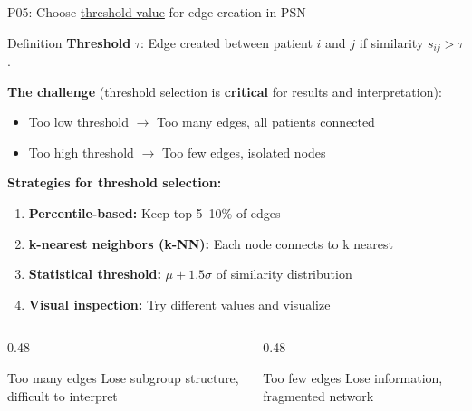 \documentclass[aspectratio=169, 10pt]{beamer}
\begin{document}
\begin{frame}{P05: Choose \href{https://en.wikipedia.org/wiki/Threshold_model}{threshold value} for edge creation in PSN}
    \begin{block}{\footnotesize Definition}
        \footnotesize \textbf{Threshold} $\tau$: Edge created between patient $i$ and $j$ if similarity $s_{ij} > \tau$.
    \end{block}
    
    \vspace{1mm}
    \textbf{The challenge} (threshold selection is \textbf{critical} for results and interpretation):
    \begin{itemize}\setlength{\itemsep}{0pt}
        \item Too low threshold $\rightarrow$ Too many edges, all patients connected
        \item Too high threshold $\rightarrow$ Too few edges, isolated nodes
    \end{itemize}
    
    \vspace{1mm}
    \textbf{Strategies for threshold selection:}
    \begin{enumerate}\setlength{\itemsep}{0pt}
        \item \textbf{Percentile-based:} Keep top 5--10\% of edges
        \item \textbf{k-nearest neighbors (k-NN):} Each node connects to k nearest
        \item \textbf{Statistical threshold:} $\mu + 1.5\sigma$ of similarity distribution
        \item \textbf{Visual inspection:} Try different values and visualize
    \end{enumerate}
    
    \vspace{1mm}
    \begin{columns}[T]
        \begin{column}{0.48\textwidth}
            \begin{alertblock}{\scriptsize Too many edges}
                \scriptsize Lose subgroup structure, difficult to interpret
            \end{alertblock}
        \end{column}
        \begin{column}{0.48\textwidth}
            \begin{alertblock}{\scriptsize Too few edges}
                \scriptsize Lose information, fragmented network
            \end{alertblock}
        \end{column}
    \end{columns}
\end{frame}
\end{document}
